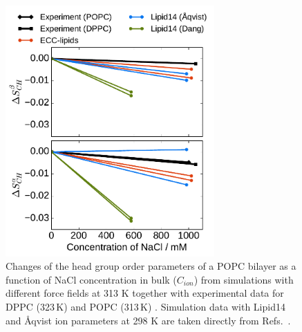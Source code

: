 \documentclass[aip,jcp,twocolumn]{revtex4}
\begin{document}
\begin{figure}[htb!]
  \centering
  \includegraphics[width=8.0cm]{../Fig/ipython_nb/OrdPars-A-B_L14-ECCL17_q80_sig89_NaCl.pdf}
  \caption{\label{fig:delta_ordPar_NaCl}
    Changes of the head group order parameters of a POPC bilayer as a function of NaCl concentration
    in bulk ($C_{ion}$) from simulations with different force fields at 313 K together with 
    experimental data for DPPC (323\,K) \cite{akutsu81} and POPC (313\,K) \cite{altenbach84}.
    Simulation data with Lipid14 and \AA{}qvist ion parameters at 298 K are taken directly from
    Refs.~\cite{lipid14POPC0mMNaClfiles,lipid14POPC1000mMNaClfiles}.
  }
\end{figure}
\end{document}
